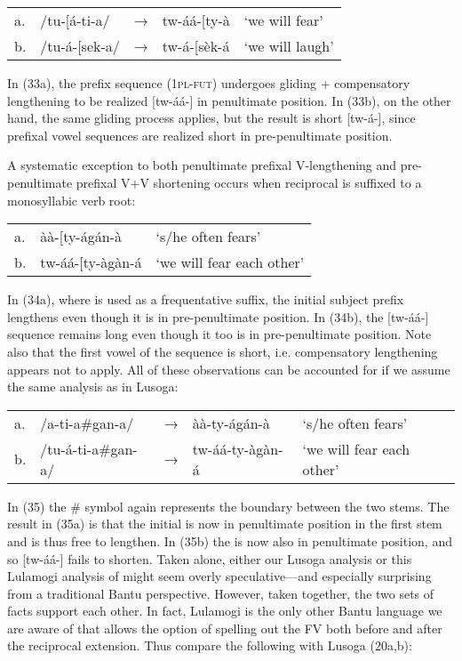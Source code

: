 \documentclass[output=paper,
modfonts
]{LSP/langsci}
\begin{document}
\ea\begin{tabular}[t]{@{}lllll}
a. & /tu-{[}á-ti-a/ &  → & tw-áá-{[}ty-à & `we will fear' \\
b. & /tu-á-{[}sek-a/ & → & tw-á-{[}sèk-á & `we will laugh'
\end{tabular}
\z

\noindent In (33a), the prefix sequence  (\textsc{1pl-fut}) undergoes
gliding + compensatory lengthening to be realized {[}tw-áá-{]} in
penultimate position. In (33b), on the other hand, the same gliding
process applies, but the result is short {[}tw-á-{]}, since prefixal
vowel sequences are realized short in pre-penultimate position.

A systematic exception to both penultimate prefixal V-lengthening and
pre-penultimate prefixal V+V shortening occurs when reciprocal
 is suffixed to a monosyllabic verb root:

\ea\begin{tabular}[t]{@{}lll}
a. & àà-{[}ty-ágán-à & `s/he often fears' \\
b. & tw-áá-{[}ty-àgàn-á & `we will fear each other' \\
\end{tabular}
\z

\noindent In (34a), where  is used as a frequentative suffix, the
initial subject prefix  lengthens even though it is in
pre-penultimate position. In (34b), the {[}tw-áá-{]} sequence remains
long even though it too is in pre-penultimate position. Note also that
the first vowel of the  sequence is short, i.e.
compensatory lengthening appears not to apply. All of these observations
can be accounted for if we assume the same analysis as in Lusoga:

\ea\begin{tabular}[t]{@{}lllll@{}}
a. & /a-ti-a\#gan-a/ & → & àà-ty-ágán-à & `s/he often fears' \\
b. & /tu-á-ti-a\#gan-a/ & → & tw-áá-ty-àgàn-á & `we will fear each other'
\end{tabular}
\z

\noindent In (35) the \# symbol again represents the boundary between the two
stems. The result in (35a) is that the initial  is now in
penultimate position in the first stem and is thus free to lengthen. In
(35b) the  is now also in penultimate position, and so
{[}tw-áá-{]} fails to shorten. Taken alone, either our Lusoga analysis
or this Lulamogi analysis of \citep{hymaninpress} might seem overly
speculative---and especially surprising from a traditional Bantu
perspective. However, taken together, the two sets of facts support each
other. In fact, Lulamogi is the only other Bantu language we are aware
of that allows the option of spelling out the FV both before and after
the reciprocal extension. Thus compare the following with Lusoga
(20a,b):
\end{document}
